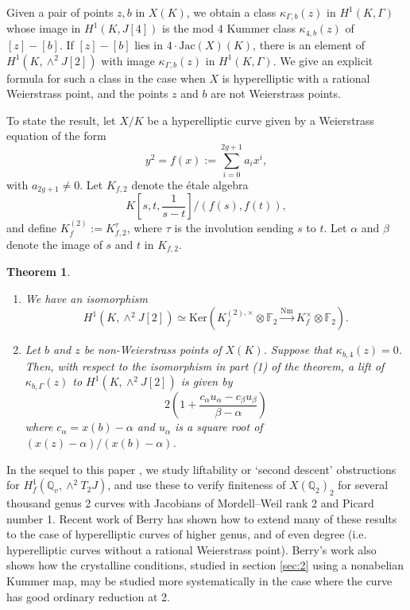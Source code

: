 \documentclass[11pt]{amsart}
\def\Q{\mathbb Q}
\theoremstyle{plain}
\newtheorem{theorem}{Theorem}
\newtheorem{proposition}{Proposition}
\theoremstyle{definition}
\DeclareMathOperator{\Gal}{Gal}
\newcommand{\Ind}{\mathrm{Ind}}
\newcommand{\Nm}{\mathrm{Nm}}
\newcommand{\Jac}{\mathrm{Jac}}
\newcommand{\Ker}{\mathrm{Ker}}
\begin{document}
Given a pair of points $z,b$ in $X(K)$, we obtain a class $\kappa _{\Gamma  ,b}(z)$ in $H^1 (K,\Gamma )$ whose image in $H^1 (K,J[4])$ is the mod $4$ Kummer class $\kappa _{4,b}(z)$ of $[z]-[b]$. If $[z]-[b]$ lies in $4\cdot \Jac (X)(K)$, there is an element of $H^1 (K,\wedge ^2 J[2])$ with image $\kappa _{\Gamma  ,b}(z)$ in $H^1 (K,\Gamma  )$. We give an explicit formula for such a class in the case when $X$ is hyperelliptic with a rational Weierstrass point, and the points $z$ and $b$ are not Weierstrass points.

To state the result, let $X/K$ be a hyperelliptic curve given by a Weierstrass equation of the form
\[
y^2 =f(x):=\sum _{i=0}^{2g+1}a_i x^i ,
\]
with $a_{2g+1}\neq 0$. 
Let $K_{f,2}$ denote the \'etale algebra
\[
K[s,t,\frac{1}{s-t}]/(f(s),f(t)),
\] 
and define $K_f ^{(2)}:=K_{f,2}^{\tau }$, where $\tau $ is the involution sending $s$ to $t$. Let $\alpha $ and $\beta $ denote the image of $s$ and $t$ in $K_{f,2}$.

\begin{theorem}
\begin{enumerate}
\item We have an isomorphism
\[
H^1 (K,\wedge ^2 J[2]) \simeq \Ker (K_f ^{(2),\times } \otimes \mathbb{F}_2 \stackrel{\Nm }{\longrightarrow }K_f ^\times \otimes \mathbb{F}_2 ).
\]
\item Let $b$ and $z$ be non-Weierstrass points of $X(K)$. Suppose that $\kappa _{b,4}(z)=0$. Then, with respect to the isomorphism in part (1) of the theorem, a lift of $\kappa _{b,\Gamma }(z)$ to $H^1 (K,\wedge ^2 J[2])$ is given by 
\[
2\left( 1+\frac{c_{\alpha }u_{\alpha }-c_{\beta }u_{\beta }}{\beta -\alpha } \right)
\]
where $c_{\alpha }=x(b)-\alpha $ and $u_{\alpha }$ is a square root of $(x(z)-\alpha )/(x(b)-\alpha )$.
\end{enumerate}
\end{theorem}
In the sequel to this paper \cite{BKdescent2}, we study liftability or `second descent' obstructions for $H^1 _f (\Q _v ,\wedge ^2 T_2 J)$, and use these to verify finiteness of $X(\Q _2 )_2 $ for several thousand genus 2 curves with Jacobians of Mordell--Weil rank 2 and Picard number 1. Recent work of Berry \cite{berry} has shown how to extend many of these results to the case of hyperelliptic curves of higher genus, and of even degree (i.e. hyperelliptic curves without a rational Weierstrass point). Berry's work also shows how the crystalline conditions, studied in section \ref{sec:2} using a nonabelian Kummer map, may be studied more systematically in the case where the curve has good ordinary reduction at 2.
\end{document}
